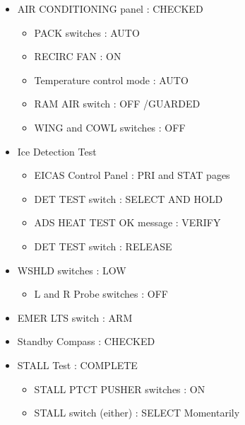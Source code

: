 \begin{itemize}
\begin{itemize}
\end{itemize}

\item AIR CONDITIONING panel : CHECKED

\begin{itemize}
\item PACK switches : AUTO

\item RECIRC FAN : ON

\item Temperature control mode : AUTO

\item RAM AIR switch : OFF \slash  GUARDED

\item WING and COWL switches : OFF

\end{itemize}

\item Ice Detection Test

\begin{itemize}
\item EICAS Control Panel : PRI and STAT pages

\item DET TEST switch : SELECT AND HOLD

\item ADS HEAT TEST OK message : VERIFY

\item DET TEST switch : RELEASE

\end{itemize}

\item WSHLD switches : LOW

\begin{itemize}
\item L and R Probe switches : OFF

\end{itemize}

\item EMER LTS switch : ARM

\item Standby Compass : CHECKED

\item STALL Test : COMPLETE

\begin{itemize}
\item STALL PTCT PUSHER switches : ON

\item STALL switch (either) : SELECT Momentarily


\end{itemize}
\end{itemize}
